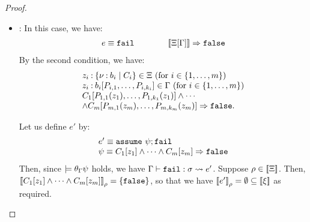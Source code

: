\begin{proof}
\begin{itemize}
\item \textit{}:
In this case, we have:
\[
\begin{array}{l}
e \equiv \mathtt{fail}\qquad\qquad
[\![\Xi[\Gamma]]\!] \Rightarrow \mathtt{false}
\end{array}
\]
By the second condition, we have:
\[
\begin{array}{l}
z_i \mathbin{:} \{\nu\mathbin{:} b_i \mid C_i\} \in \Xi \mbox{ (for $i\in\{1,\ldots,m\}$)}\\
z_i \mathbin{:} b_i[P_{i,1},\ldots,P_{i,k_i}] \in \Gamma\mbox{ (for $i\in\{1,\ldots,m\}$)}\\
C_1[P_{1,1}(z_1),\ldots,P_{1,k_1}(z_1)]\land \cdots\\
\land C_m[P_{m,1}(z_m),\ldots,P_{m,k_m}(z_m)]\Rightarrow \mathtt{false}.
\end{array}
\]

Let us define \(e'\) by:
\[
\begin{array}{l}
e' \equiv \ASSUME{\psi}{\FAIL}\\
\psi \equiv C_1[z_1]\land \cdots \land C_m[z_m] \imply \FALSE\\  %
\end{array}
\]
Then, since \(\models \theta_{\Gamma}\psi\) holds,
we have \(\Gamma \vdash \mathtt{fail} : \sigma \leadsto e'\).
Suppose \(\rho\in \mathbin{[\![}\Xi\mathbin{]\!]}\). Then, \(\mathbin{[\![}C_1[z_1]\land \cdots \land C_m[z_m]\mathbin{]\!]}_{\rho} = \{\mathtt{false}\}\),
so that we have \(\mathbin{[\![}e'\mathbin{]\!]}_{\rho} = \emptyset \subseteq \mathbin{[\![}\xi\mathbin{]\!]}\) as required.


\end{itemize}
\end{proof}
